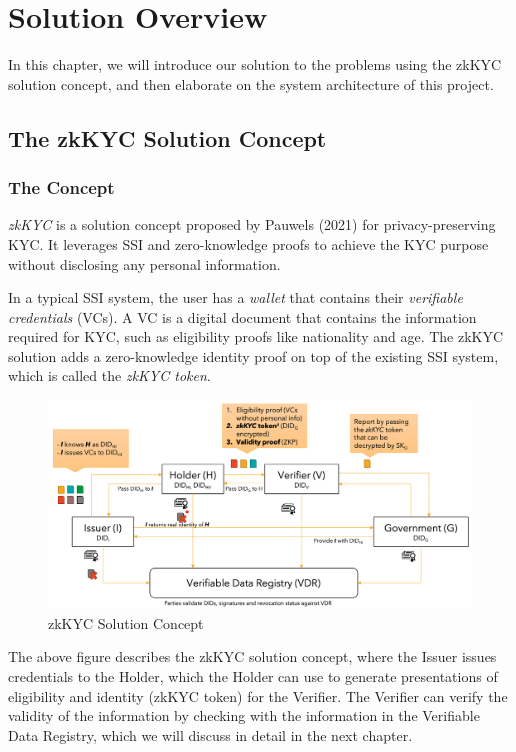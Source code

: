 \documentclass[
]{report}
\begin{document}
\chapter{Solution Overview}
In this chapter, we will introduce our solution to the problems using
the zkKYC solution concept, and then elaborate on the system
architecture of this project.

\section{The zkKYC Solution Concept}

\subsection{The Concept}
\emph{zkKYC} is a solution concept proposed by Pauwels (2021) for
privacy-preserving KYC. It leverages SSI and zero-knowledge proofs to
achieve the KYC purpose without disclosing any personal information.

In a typical SSI system, the user has a \emph{wallet} that contains
their \emph{verifiable credentials} (VCs). A VC is a digital document
that contains the information required for KYC, such as eligibility
proofs like nationality and age. The zkKYC solution
adds a zero-knowledge identity proof on top of the existing SSI
system, which is called the \emph{zkKYC token}.

\begin{figure}
\centering
\includegraphics{zkkyc-system.png}
\caption{zkKYC Solution Concept}
\end{figure}

The above figure describes the zkKYC solution concept, where the Issuer
issues credentials to the Holder, which the Holder can use to generate
presentations of eligibility and identity (zkKYC token) for the Verifier.
The Verifier can verify the validity of the information by checking with
the information in the Verifiable Data Registry, which we will discuss
in detail in the next chapter.
\end{document}
